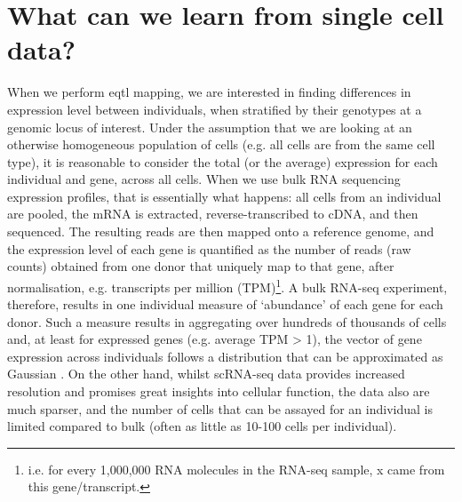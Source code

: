 \newpage

\section{What can we learn from single cell data?}

When we perform \gls{eqtl} mapping, we are interested in finding differences in expression level between individuals, when stratified by their genotypes at a genomic locus of interest. 
Under the assumption that we are looking at an otherwise homogeneous population of cells (e.g. all cells are from the same cell type), it is reasonable to consider the total (or the average) expression for each individual and gene, across all cells.
When we use bulk RNA sequencing expression profiles, that is essentially what happens: all cells from an individual are pooled, the mRNA is extracted, reverse-transcribed to cDNA, and then sequenced. 
The resulting reads are then mapped onto a reference genome, and the expression level of each gene is quantified as the number of reads (raw counts) obtained from one donor that uniquely map to that gene, after normalisation, e.g. transcripts per million (TPM)\footnote{i.e. for every 1,000,000 RNA molecules in the RNA-seq sample, x came from this gene/transcript.}. 
A bulk RNA-seq experiment, therefore, results in one individual measure of `abundance' of each gene for each donor. 
Such a measure results in 
aggregating over 
hundreds of thousands of cells
and, at least for expressed genes (e.g. average TPM > 1), the vector of gene expression across individuals follows a distribution that can be approximated as Gaussian \cite{piras2015reduction}.
On the other hand,
whilst scRNA-seq data provides increased resolution and promises great insights into cellular function, the data also are much sparser, and the number of cells that can be assayed for an individual is limited compared to bulk (often as little as 10-100 cells per individual). 
